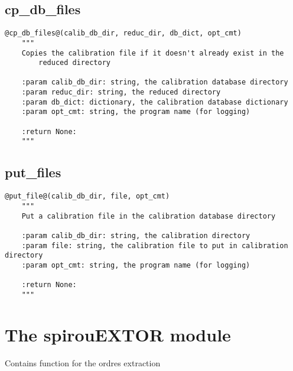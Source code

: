 \vspace{0.5cm}
\subsection{cp\_db\_files}
\begin{lstlisting}[style=pythonstyle]
@cp_db_files@(calib_db_dir, reduc_dir, db_dict, opt_cmt)
    """
    Copies the calibration file if it doesn't already exist in the
        reduced directory

    :param calib_db_dir: string, the calibration database directory
    :param reduc_dir: string, the reduced directory
    :param db_dict: dictionary, the calibration database dictionary
    :param opt_cmt: string, the program name (for logging)

    :return None:
    """
\end{lstlisting}

\vspace{0.5cm}
\subsection{put\_files}
\begin{lstlisting}[style=pythonstyle]
@put_file@(calib_db_dir, file, opt_cmt)
    """
    Put a calibration file in the calibration database directory
    
    :param calib_db_dir: string, the calibration directory 
    :param file: string, the calibration file to put in calibration directory
    :param opt_cmt: string, the program name (for logging)
    
    :return None: 
    """
\end{lstlisting}

\clearpage
\newpage
\section{The spirouEXTOR module}

Contains function for the ordres extraction

